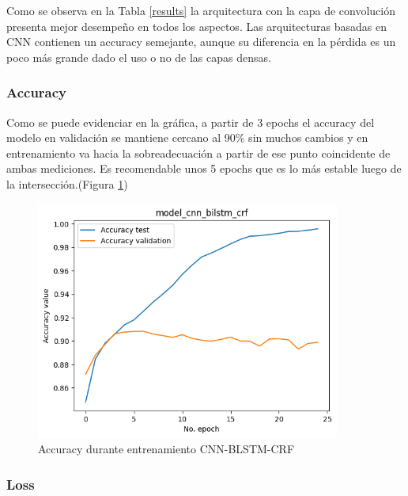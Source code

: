 \documentclass[runningheads]{llncs}
\begin{document}
Como se observa en la Tabla \ref{results} la arquitectura con la capa de convolución
presenta mejor desempeño en todos los aspectos. Las arquitecturas basadas en CNN 
contienen un accuracy semejante, aunque su diferencia en la pérdida es un poco más
grande dado el uso o no de las capas densas.

\subsubsection{Accuracy}

Como se puede evidenciar en la gráfica, a partir de 3 epochs el accuracy del modelo en validación se mantiene cercano al 90\% sin muchos cambios y en entrenamiento va hacia la sobreadecuación a partir de ese punto coincidente de ambas mediciones. Es recomendable unos 5 epochs que es lo más estable luego de la intersección.(Figura \ref{acc_fig})

\begin{figure}
	\centering
	\includegraphics[width=10cm]{model_cnn_BiLSTM_crf_acc.png}
	\caption{Accuracy durante entrenamiento CNN-BLSTM-CRF}
	\label{acc_fig}
\end{figure}

\subsubsection{Loss}
\end{document}
